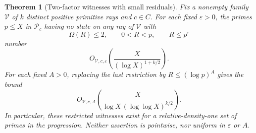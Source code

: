 \documentclass[11pt]{article}
\newtheorem{theorem}{Theorem}[section]
\theoremstyle{remark}\newtheorem{remark}[theorem]{Remark}
\newcommand{\Pcal}{\mathcal P}
\newcommand{\Om}{\Omega}
\begin{document}
\begin{theorem}[Two-factor witnesses with small residuals]\label{thm:small}
Fix a nonempty family $\mathcal V$ of $k$ distinct positive primitive rays and $c\in C$. For each fixed $\varepsilon>0$, the primes $p\le X$ in $\Pcal_c$ having no state on any ray of $\mathcal V$ with
\[
 \Om(R)\le2,\qquad 0<R<p,\qquad R\le p^\varepsilon
\]
number
\begin{equation}\label{eq:smallpower}
 O_{\mathcal V,c,\varepsilon}\!\left(\frac{X}{(\log X)^{1+k/2}}\right).
\end{equation}
For each fixed $A>0$, replacing the last restriction by $R\le(\log p)^A$ gives the bound
\begin{equation}\label{eq:smallpolylog}
 O_{\mathcal V,c,A}\!\left(\frac{X}{\log X\,(\log\log X)^{k/2}}\right).
\end{equation}
In particular, these restricted witnesses exist for a relative-density-one set of primes in the progression. Neither assertion is pointwise, nor uniform in $\varepsilon$ or $A$.
\end{theorem}
\end{document}
